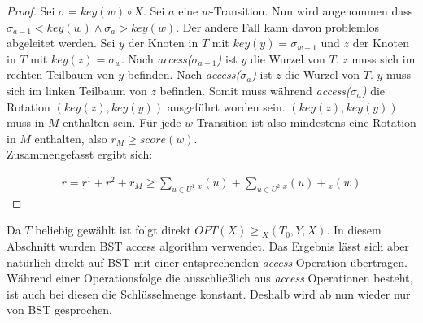 \documentclass[a4paper,12pt]{article}
\begin{document}
\begin{proof}
Sei $\sigma = \mathit{key}(w) \circ X$. Sei $a$ eine $w$-Transition. Nun wird angenommen dass $\sigma_{a-1} < \mathit{key}(w)  \land \sigma_{a} > \mathit{key}(w)$. Der andere Fall kann davon problemlos abgeleitet werden. Sei $y$ der Knoten in $T$ mit $\mathit{key}(y) = \sigma_{w-1}$ und $z$ der Knoten in $T$ mit $\mathit{key}(z) = \sigma_{w}$. Nach \textit{access($\sigma_{a-1}$)} ist $y$ die Wurzel von $T$. $z$ muss sich im rechten Teilbaum von $y$ befinden. Nach  \textit{access($\sigma_{a}$)} ist $z$ die Wurzel von $T$. $y$ muss sich im linken Teilbaum von $z$ befinden. Somit muss während \textit{access($\sigma_{a}$)} die Rotation $(\mathit{key}(z),\mathit{key}(y))$ ausgeführt worden sein. $(\mathit{key}(z),\mathit{key}(y))$ muss in $M$ enthalten sein. Für jede $w$-Transition ist also mindestens eine Rotation in $M$ enthalten, also $r_M \geq  \mathit{score} \left(w\right)$.\\
Zusammengefasst ergibt sich:

\begin{align*}
r = r^1 + r^2 + r_M \geq \sum_{u \in U^1} {_x} (u) + \sum_{u \in U^2} {_x} (u) +  {_x} (w)
\end{align*}



	
\end{proof}

\noindent Da $T$ beliebig gewählt ist folgt direkt $\mathit{OPT}\left(X\right) \geq {_X(T_0, Y, X)} $.  
In diesem Abschnitt wurden BST access algorithm verwendet. Das Ergebnis lässt sich aber natürlich direkt auf BST mit einer entsprechenden \textit{access} Operation übertragen. Während einer Operationsfolge die ausschließlich aus \textit{access} Operationen besteht, ist auch bei diesen die Schlüsselmenge konstant. Deshalb wird ab nun wieder nur von BST gesprochen.  
\end{document}
